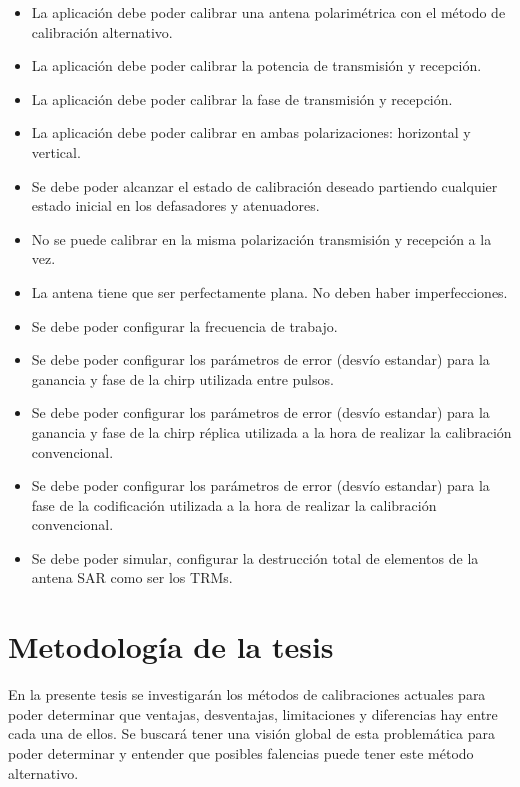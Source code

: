 \begin{itemize}
    \item La aplicación debe poder calibrar una antena polarimétrica con el método de calibración alternativo.
    
    \item La aplicación debe poder calibrar la potencia de transmisión y recepción.
    
    \item La aplicación debe poder calibrar la fase de transmisión y recepción.
    
    \item La aplicación debe poder calibrar en ambas polarizaciones: horizontal y vertical.
    
    \item Se debe poder alcanzar el estado de calibración deseado partiendo cualquier estado inicial en los defasadores y 
			atenuadores.
    
    \item No se puede calibrar en la misma polarización transmisión y recepción a la vez.
    
    \item La antena tiene que ser perfectamente plana. No deben haber imperfecciones.
           
    \item Se debe poder configurar la frecuencia de trabajo.

    \item Se debe poder configurar los parámetros de error (desvío estandar) para la ganancia y fase de la chirp utilizada 
			entre pulsos.

    \item Se debe poder configurar los parámetros de error (desvío estandar) para la ganancia y fase de la chirp réplica 
			utilizada a la hora de realizar la calibración convencional.
    
    \item Se debe poder configurar los parámetros de error (desvío estandar) para la fase de la codificación utilizada a la 
			hora de realizar la calibración convencional.

    \item Se debe poder simular, configurar la destrucción total de elementos de la antena SAR como ser los TRMs.
\end{itemize}


\section{Metodología de la tesis}
En la presente tesis se investigarán los métodos de calibraciones actuales para poder determinar que ventajas, desventajas, 
limitaciones y diferencias hay entre cada una de ellos. Se buscará tener una visión global de esta problemática para poder 
determinar y entender que posibles falencias puede tener este método alternativo.

